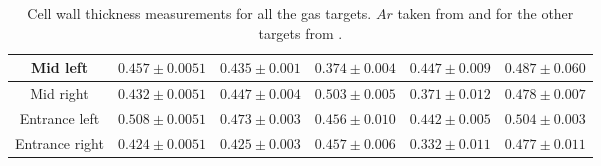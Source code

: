 \documentclass[final,5p,times,twocolumn]{elsarticle}
\begin{document}
\begin{table}[!h]
\begin{adjustbox}{width=1\textwidth}
\begin{tabular}{|c|c|c|c|c|c|}
Mid left             &        $0.457 \pm 0.0051$                                                  & $0.435 \pm 0.001$                                                     & $0.374 \pm 0.004$                                                     & $0.447 \pm 0.009$                                                     & $0.487 \pm 0.060$                                                      \\ \hline
Mid right             &        $0.432 \pm 0.0051$                                                  & $0.447 \pm 0.004$                                                     & $0.503 \pm 0.005$                                                     & $0.371 \pm 0.012$                                                     & $0.478 \pm 0.007$                                                    \\ \hline
Entrance left      &          $0.508 \pm 0.0051$                                                  & $0.473 \pm 0.003$                                                     & $0.456 \pm 0.010$                                                     & $0.442 \pm 0.005$                                                     & $0.504 \pm 0.003$                                                      \\ \hline
Entrance right     &		 $0.424 \pm 0.0051$                             & $0.425 \pm 0.003$                                & 
$0.457 \pm 0.006$                                & 
$0.332 \pm 0.011$                                & 
$0.477 \pm 0.011$                                 \\ \hline
\end{tabular}
\end{adjustbox}
\caption{Cell wall thickness measurements for all the gas targets. $Ar$ taken from \cite{ar_config} and for the other targets from \cite{cellconfig}.}
\label{tab:cell}
\end{table}
\end{document}
